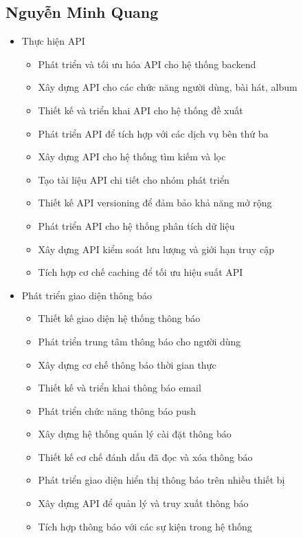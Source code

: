 \subsection{Nguyễn Minh Quang}
\begin{itemize}
    \item Thực hiện API
    \begin{itemize}
        \item Phát triển và tối ưu hóa API cho hệ thống backend
        \item Xây dựng API cho các chức năng người dùng, bài hát, album
        \item Thiết kế và triển khai API cho hệ thống đề xuất
        \item Phát triển API để tích hợp với các dịch vụ bên thứ ba
        \item Xây dựng API cho hệ thống tìm kiếm và lọc
        \item Tạo tài liệu API chi tiết cho nhóm phát triển
        \item Thiết kế API versioning để đảm bảo khả năng mở rộng
        \item Phát triển API cho hệ thống phân tích dữ liệu
        \item Xây dựng API kiểm soát lưu lượng và giới hạn truy cập
        \item Tích hợp cơ chế caching để tối ưu hiệu suất API
    \end{itemize}
    
    \item Phát triển giao diện thông báo
    \begin{itemize}
        \item Thiết kế giao diện hệ thống thông báo
        \item Phát triển trung tâm thông báo cho người dùng
        \item Xây dựng cơ chế thông báo thời gian thực
        \item Thiết kế và triển khai thông báo email
        \item Phát triển chức năng thông báo push
        \item Xây dựng hệ thống quản lý cài đặt thông báo
        \item Thiết kế cơ chế đánh dấu đã đọc và xóa thông báo
        \item Phát triển giao diện hiển thị thông báo trên nhiều thiết bị
        \item Xây dựng API để quản lý và truy xuất thông báo
        \item Tích hợp thông báo với các sự kiện trong hệ thống
    \end{itemize}
    

\end{itemize}
